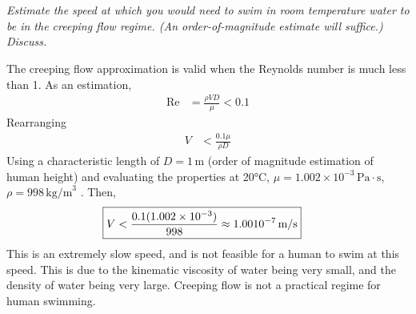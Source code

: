 \section{}
\textit{Estimate the speed at which you would need to swim in room temperature water to be in the creeping flow regime. (An order-of-magnitude estimate will suffice.) Discuss.}

The creeping flow approximation is valid when the Reynolds number is much less than 1. As an estimation,
\begin{align*}
    \text{Re} &= \frac{\rho VD}{\mu} < 0.1
\end{align*}
Rearranging
\begin{align*}
    V &< \frac{0.1\mu}{\rho D}
\end{align*}
Using a characteristic length of $D = 1 \, \text{m}$ (order of magnitude estimation of human height) and evaluating the properties at 20°C, $\mu = 1.002 \times 10^{-3} \, \text{Pa} \cdot \text{s}$, $\rho = 998 \, \text{kg/m}^3$ \cite{cengel_thermodynamics:_2024}. Then,
\begin{align*}
    \Aboxed{V &< \frac{0.1(1.002 \times 10^{-3})}{998} \approx 1.00 10^{-7} \, \text{m/s}}
\end{align*}
This is an extremely slow speed, and is not feasible for a human to swim at this speed. This is due to the kinematic viscosity of water being very small, and the density of water being very large. Creeping flow is not a practical regime for human swimming.